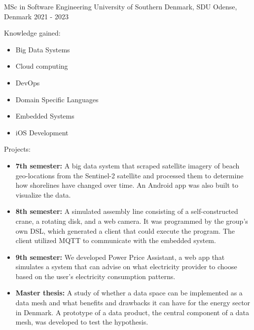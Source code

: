 \begin{cventries}
\cventry
{MSc in Software Engineering} %
{University of Southern Denmark, SDU} %
{Odense, Denmark} %
{2021 - 2023} %
{
  \begin{cvitems} %
    \item {Knowledge gained: }
    \begin{itemize} %
      \item {Big Data Systems}
      \item {Cloud computing}
      \item {DevOps}
      \item {Domain Specific Languages}
      \item {Embedded Systems}
      \item {iOS Development}
    \end{itemize}
    \item {Projects: }
    \begin{itemize} %
      \item {\textbf{7th semester:} A big data system that scraped satellite imagery of beach geo-locations from the Sentinel-2 satellite and processed them to determine how shorelines have changed over time. An Android app was also built to visualize the data.}
      \item {\textbf{8th semester:} A simulated assembly line consisting of a self-constructed crane, a rotating disk, and a web camera. It was programmed by the group's own DSL, which generated a client that could execute the program. The client utilized MQTT to communicate with the embedded system.}
      \item {\textbf{9th semester:} We developed Power Price Assistant, a web app that simulates a system that can advise on what electricity provider to choose based on the user's electricity consumption patterns.}
      \item {\textbf{Master thesis:} A study of whether a data space can be implemented as a data mesh and what benefits and drawbacks it can have for the energy sector in Denmark. A prototype of a data product, the central component of a data mesh, was developed to test the hypothesis. }
    \end{itemize}
  \end{cvitems}
}
\end{cventries}

